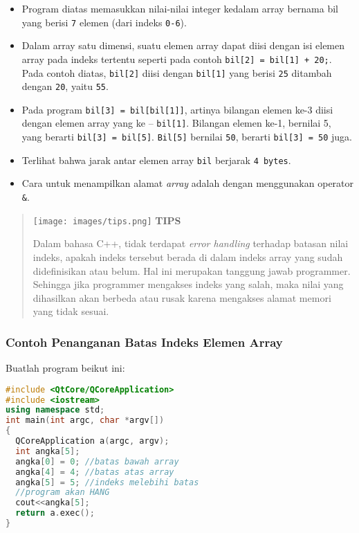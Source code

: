 \begin{itemize}

\item
  Program diatas memasukkan nilai-nilai integer kedalam array bernama
  bil yang berisi \texttt{7} elemen (dari indeks \texttt{0-6}).
\item
  Dalam array satu dimensi, suatu elemen array dapat diisi dengan isi
  elemen array pada indeks tertentu seperti pada contoh
  \texttt{bil{[}2{]}\ =\ bil{[}1{]}\ +\ 20;}. Pada contoh diatas,
  \texttt{bil{[}2{]}} diisi dengan \texttt{bil{[}1{]}} yang berisi
  \texttt{25} ditambah dengan \texttt{20}, yaitu \texttt{55}.
\item
  Pada program \texttt{bil{[}3{]}\ =\ bil{[}bil{[}1{]}{]}}, artinya
  bilangan elemen ke-3 diisi dengan elemen array yang ke --
  \texttt{bil{[}1{]}}. Bilangan elemen ke-1, bernilai 5, yang berarti
  \texttt{bil{[}3{]}\ =\ bil{[}5{]}}. \texttt{Bil{[}5{]}} bernilai
  \texttt{50}, berarti \texttt{bil{[}3{]}\ =\ 50} juga.
\item
  Terlihat bahwa jarak antar elemen array \texttt{bil} berjarak
  \texttt{4\ bytes}.
\item
  Cara untuk menampilkan alamat \emph{array} adalah dengan menggunakan
  operator \texttt{\&}.
\end{itemize}
\begin{quotation}
\texttt{[image: images/tips.png]}	\textbf{TIPS} 
	
	Dalam
	bahasa C++, tidak terdapat \emph{error handling} terhadap batasan nilai
	indeks, apakah indeks tersebut berada di dalam indeks array yang sudah
	didefinisikan atau belum. Hal ini merupakan tanggung jawab programmer.
	Sehingga jika programmer mengakses indeks yang salah, maka nilai yang
	dihasilkan akan berbeda atau rusak karena mengakses alamat memori yang
	tidak sesuai.
\end{quotation}
 

\subsubsection*{Contoh  Penanganan Batas Indeks Elemen Array}

Buatlah program beikut ini:

\begin{lstlisting}[language=c++, caption=Penanganan Batas Indeks Elemen Array, label=contoh3-3]
#include <QtCore/QCoreApplication>
#include <iostream>
using namespace std;
int main(int argc, char *argv[])
{
  QCoreApplication a(argc, argv);
  int angka[5];
  angka[0] = 0; //batas bawah array
  angka[4] = 4; //batas atas array
  angka[5] = 5; //indeks melebihi batas
  //program akan HANG
  cout<<angka[5];
  return a.exec();
}
\end{lstlisting}

